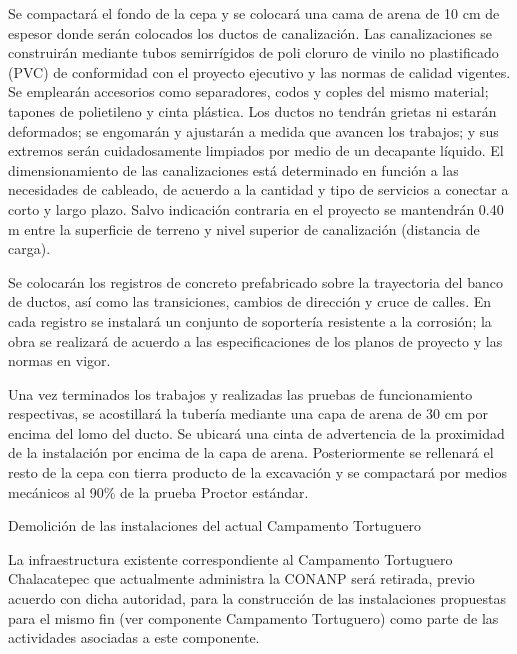 \documentclass{article}
\begin{document}
Se compactará el fondo de la cepa y se colocará una cama de arena de 10 cm de espesor donde serán colocados los ductos de canalización. Las canalizaciones se construirán mediante tubos semirrígidos de poli cloruro de vinilo no plastificado (PVC) de conformidad con el proyecto ejecutivo y las normas de calidad vigentes. Se emplearán accesorios como separadores, codos y coples del mismo material; tapones de polietileno y cinta plástica. Los ductos no tendrán grietas ni estarán deformados; se engomarán y ajustarán a medida que avancen los trabajos; y sus extremos serán cuidadosamente limpiados por medio de un decapante líquido. El dimensionamiento de las canalizaciones está determinado en función a las necesidades de cableado, de acuerdo a la cantidad y tipo de servicios a conectar a corto y largo plazo. Salvo indicación contraria en el proyecto se mantendrán 0.40 m entre la superficie de terreno y nivel superior de canalización (distancia de carga).


\bigskip

Se colocarán los registros de concreto prefabricado sobre la trayectoria del banco de ductos, así como las transiciones, cambios de dirección y cruce de calles. En cada registro se instalará un conjunto de soportería resistente a la corrosión; la obra se realizará de acuerdo a las especificaciones de los planos de proyecto y las normas en vigor. 

Una vez terminados los trabajos y realizadas las pruebas de funcionamiento respectivas, se acostillará la tubería mediante una capa de arena de 30 cm por encima del lomo del ducto. Se ubicará una cinta de advertencia de la proximidad de la instalación por encima de la capa de arena. Posteriormente se rellenará el resto de la cepa con tierra producto de la excavación y se compactará por medios mecánicos al 90\% de la prueba Proctor estándar.


\bigskip


\bigskip

Demolición de las instalaciones del actual Campamento Tortuguero


\bigskip

La infraestructura existente correspondiente al Campamento Tortuguero Chalacatepec que actualmente administra la CONANP será retirada, previo acuerdo con dicha autoridad, para la construcción de las instalaciones propuestas para el mismo fin (ver componente Campamento Tortuguero) como parte de las actividades asociadas a este componente.


\bigskip
\end{document}
